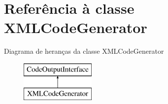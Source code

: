 \hypertarget{class_x_m_l_code_generator}{\section{Referência à classe X\-M\-L\-Code\-Generator}
\label{class_x_m_l_code_generator}
}
Diagrama de heranças da classe X\-M\-L\-Code\-Generator\begin{figure}[H]
\begin{center}
\leavevmode
\includegraphics[height=2.000000cm]{class_x_m_l_code_generator}
\end{center}
\end{figure}
